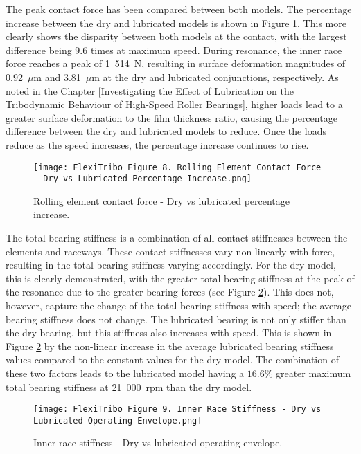 The peak contact force has been compared between both models. The percentage increase between the dry and lubricated models is shown in Figure \ref{Rolling element contact force - Dry vs lubricated percentage increase}. This more clearly shows the disparity between both models at the contact, with the largest difference being 9.6 times at maximum speed. During resonance, the inner race force reaches a peak of 1~514~$\mathrm{N}$, resulting in surface deformation magnitudes of 0.92~$\mu \mathrm{m}$ and 3.81~$\mu \mathrm{m}$ at the dry and lubricated conjunctions, respectively. As noted in the Chapter \ref{Investigating the Effect of Lubrication on the Tribodynamic Behaviour of High-Speed Roller Bearings}, higher loads lead to a greater surface deformation to the film thickness ratio, causing the percentage difference between the dry and lubricated models to reduce. Once the loads reduce as the speed increases, the percentage increase continues to rise.

\begin{figure}
	\centering  
	\texttt{[image: FlexiTribo Figure 8. Rolling Element Contact Force - Dry vs Lubricated Percentage Increase.png]}
	\caption{Rolling element contact force - Dry vs lubricated percentage increase.}
	\label{Rolling element contact force - Dry vs lubricated percentage increase}
\end{figure} 

The total bearing stiffness is a combination of all contact stiffnesses between the elements and raceways. These contact stiffnesses vary non-linearly with force, resulting in the total bearing stiffness varying accordingly. For the dry model, this is clearly demonstrated, with the greater total bearing stiffness at the peak of the resonance due to the greater bearing forces (see Figure \ref{Inner race stiffness - Dry vs lubricated operating envelope}). This does not, however, capture the change of the total bearing stiffness with speed; the average bearing stiffness does not change. The lubricated bearing is not only stiffer than the dry bearing, but this stiffness also increases with speed. This is shown in Figure \ref{Inner race stiffness - Dry vs lubricated operating envelope} by the non-linear increase in the average lubricated bearing stiffness values compared to the constant values for the dry model. The combination of these two factors leads to the lubricated model having a $16.6 \%$ greater maximum total bearing stiffness at 21~000~$\mathrm{rpm}$ than the dry model.

\begin{figure}
	\centering  
	\texttt{[image: FlexiTribo Figure 9. Inner Race Stiffness - Dry vs Lubricated Operating Envelope.png]}
	\caption{Inner race stiffness - Dry vs lubricated operating envelope.}
	\label{Inner race stiffness - Dry vs lubricated operating envelope}
\end{figure} 

